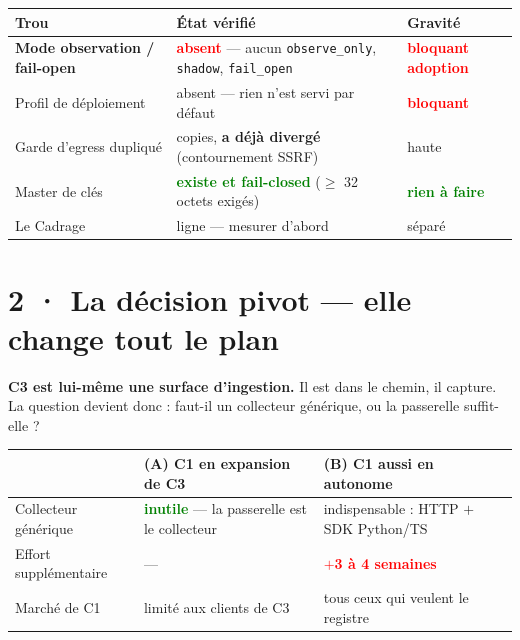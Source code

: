 \documentclass[10pt]{article}
\newcommand{\best}[1]{\textcolor{green}{\textbf{#1}}}
\newcommand{\pire}[1]{\textcolor{red}{\textbf{#1}}}
\newcommand{\code}[1]{\texttt{\small #1}}
\begin{document}
\begin{center}\small
\begin{tabular}{@{}>{\raggedright\arraybackslash}p{3.9cm} >{\raggedright\arraybackslash}p{8.6cm} >{\centering\arraybackslash}p{2.7cm}@{}}
\toprule
\textbf{Trou} & \textbf{État vérifié} & \textbf{Gravité} \\
\midrule
\textbf{Mode observation / fail-open} & \pire{absent} --- aucun \code{observe\_only}, \code{shadow}, \code{fail\_open} & \pire{bloquant adoption} \\
Profil de déploiement & absent --- rien n'est servi par défaut & \pire{bloquant} \\
Garde d'egress dupliqué & 2 copies, \textbf{a déjà divergé} (contournement SSRF) & haute \\
Master de clés & \best{existe et fail-closed} ($\geq$ 32 octets exigés) & \best{rien à faire} \\
Le Cadrage & 0 ligne --- mesurer d'abord & séparé \\
\bottomrule
\end{tabular}
\end{center}

\section{2 · La décision pivot --- elle change tout le plan}

\textbf{C3 est lui-même une surface d'ingestion.} Il est dans le chemin, il capture. La question
devient donc : faut-il un collecteur générique, ou la passerelle suffit-elle ?

\renewcommand{\arraystretch}{1.24}
\begin{center}\small
\begin{tabular}{@{}>{\raggedright\arraybackslash}p{3.6cm} >{\raggedright\arraybackslash}p{5.9cm} >{\raggedright\arraybackslash}p{5.7cm}@{}}
\toprule
& \textbf{(A) C1 en expansion de C3} & \textbf{(B) C1 aussi en autonome} \\
\midrule
Collecteur générique & \best{inutile} --- la passerelle est le collecteur & indispensable : HTTP $+$ SDK Python/TS \\
Effort supplémentaire & --- & \pire{$+$3 à 4 semaines} \\
Marché de C1 & limité aux clients de C3 & tous ceux qui veulent le registre \\
\bottomrule
\end{tabular}
\end{center}
\end{document}

